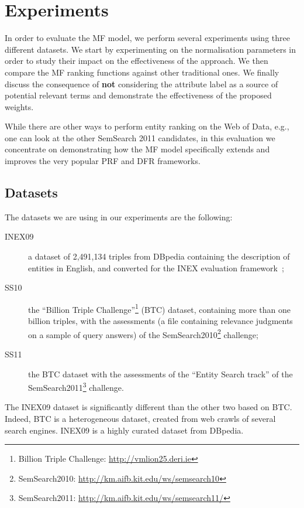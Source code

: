 \section{Experiments}
\label{sec:experiments}

In order to evaluate the MF model, we perform several experiments using three different datasets. We start by experimenting on the normalisation parameters in order to study their impact on the effectiveness of the approach. We then compare the MF ranking functions against other traditional ones. We finally discuss the consequence of \textbf{not} considering the attribute label as a source of potential relevant terms and demonstrate the effectiveness of the proposed weights.

While there are other ways to perform entity ranking on the Web of Data, e.g., one can look at the other SemSearch 2011 candidates, in this evaluation we concentrate on demonstrating how the MF model specifically extends and improves the very popular PRF and DFR frameworks.

\subsection{Datasets}
\label{sec:datasets}

The datasets we are using in our experiments are the following:
\begin{description}
  \item[INEX09] a dataset of 2,491,134 triples from DBpedia containing the description of entities in English, and converted for the INEX evaluation framework~\cite{Perez-Aguera:2010:UBS};
  \item[SS10] the ``Billion Triple Challenge''\footnote{Billion Triple Challenge: \url{http://vmlion25.deri.ie}} (BTC) dataset, containing more than one billion triples, with the assessments (a file containing relevance judgments on a sample of query answers) of the SemSearch2010\footnote{SemSearch2010: \url{http://km.aifb.kit.edu/ws/semsearch10}} challenge;
  \item[SS11] the BTC dataset with the assessments of the ``Entity Search track'' of the SemSearch2011\footnote{SemSearch2011: \url{http://km.aifb.kit.edu/ws/semsearch11/}} challenge.
\end{description}
The INEX09 dataset is significantly different than the other two based on BTC. Indeed, BTC is a heterogeneous dataset, created from web crawls of several search engines. INEX09 is a highly curated dataset from DBpedia.

